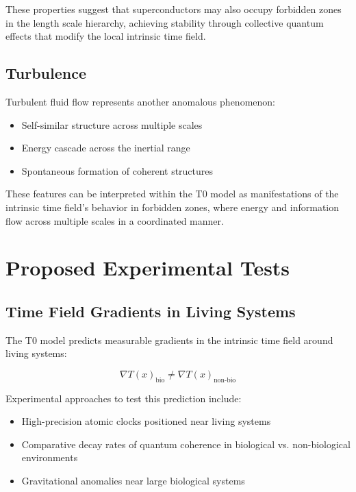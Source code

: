 \documentclass[12pt,a4paper]{article}
\newcommand{\Tfield}{T(x)}
\begin{document}
	These properties suggest that superconductors may also occupy forbidden zones in the length scale hierarchy, achieving stability through collective quantum effects that modify the local intrinsic time field.
	
	\subsection{Turbulence}
	\label{subsec:turbulence}
	
	Turbulent fluid flow represents another anomalous phenomenon:
	
	\begin{itemize}
		\item Self-similar structure across multiple scales
		\item Energy cascade across the inertial range
		\item Spontaneous formation of coherent structures
	\end{itemize}
	
	These features can be interpreted within the T0 model as manifestations of the intrinsic time field's behavior in forbidden zones, where energy and information flow across multiple scales in a coordinated manner.
	
	\section{Proposed Experimental Tests}
	\label{sec:experimental_tests}
	
	\subsection{Time Field Gradients in Living Systems}
	\label{subsec:time_field_gradients}
	
	The T0 model predicts measurable gradients in the intrinsic time field around living systems:
	
	\begin{equation}
		\nabla \Tfield_{\text{bio}} \neq \nabla \Tfield_{\text{non-bio}}
	\end{equation}
	
	Experimental approaches to test this prediction include:
	
	\begin{itemize}
		\item High-precision atomic clocks positioned near living systems
		\item Comparative decay rates of quantum coherence in biological vs. non-biological environments
		\item Gravitational anomalies near large biological systems
	\end{itemize}
	
\end{document}
